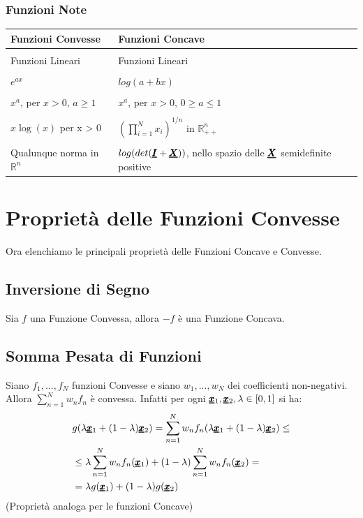 \subsubsection{Funzioni Note}
\begin{table}[h!]
    \centering
    \begin{tabular}{l|l}
       \textbf{Funzioni Convesse}  &  \textbf{Funzioni Concave}\\
       \hline
        \\
         Funzioni  Lineari & Funzioni  Lineari \\ \\
         $e^{ax}$ & $log(a + bx)$ \\ \\
         $x^a$, per $x>0$, $a\geq 1$ & $x^a$, per $x>0$, $0 \geq a\leq 1$ \\ \\
         $x \log(x)$ per x > 0 & $\left(\prod_{i=1}^N x_i\right)^{1/n}$ in $\mathbb{R}^n_{++}$ \\ \\
         Qualunque norma in $\mathbb{R}^n$ & $log(det(\pmb{\underline{I}} + \pmb{\underline{X}}))$, nello spazio delle $\pmb{\underline{X}}$ semidefinite positive
    \end{tabular}
\end{table}


\section{Proprietà delle Funzioni Convesse}
Ora elenchiamo le principali proprietà delle Funzioni Concave e Convesse.
\subsection{Inversione di Segno}
Sia $f$ una Funzione Convessa, allora $-f$ è una Funzione Concava.
\subsection{Somma Pesata di Funzioni}
Siano $f_1,...,f_N$ funzioni Convesse e siano $w_1,...,w_N$ dei coefficienti non-negativi.
Allora $\sum_{n=1}^N w_n f_n$ è convessa.
Infatti per ogni $\pmb{\underline{x}}_1, \pmb{\underline{x}}_2, \lambda \in [0,1]$ si ha:
\begin{equation*}
\begin{aligned}
        &g(\lambda \pmb{\underline{x}}_1 +(1 - \lambda)\pmb{\underline{x}}_2 ) = \sum_{n=1}^N w_n f_n (\lambda \pmb{\underline{x}}_1 +(1 - \lambda)\pmb{\underline{x}}_2 ) \leq \\
        &\leq \lambda \sum_{n=1}^N w_n f_n(\pmb{\underline{x}}_1) + (1 - \lambda) \sum_{n=1}^N w_n f_n(\pmb{\underline{x}}_2) = \\
        &= \lambda g(\pmb{\underline{x}}_1) +  (1 - \lambda) g(\pmb{\underline{x}}_2)
\end{aligned}
\end{equation*}
(Proprietà analoga per le funzioni Concave)

